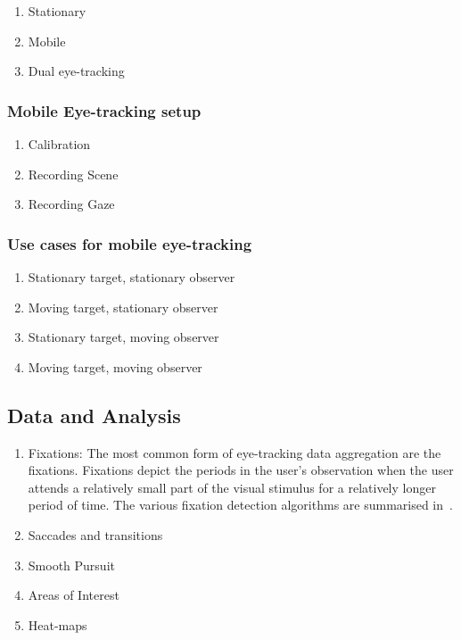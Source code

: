 \documentclass{sig-alternate}
\begin{document}

\begin{enumerate}
\item Stationary
\item Mobile 
\item Dual eye-tracking

\end {enumerate}


\subsubsection{Mobile Eye-tracking setup}

\begin{enumerate}
\item Calibration
\item Recording Scene 
\item Recording Gaze

\end {enumerate}

\subsubsection{Use cases for mobile eye-tracking} 

\begin{enumerate}
\item Stationary target, stationary observer
\item Moving target, stationary observer
\item Stationary target, moving observer
\item Moving target, moving observer
\end{enumerate}


\subsection{Data and Analysis}

\begin{enumerate}
\item Fixations: The most common form of eye-tracking data aggregation are the fixations.
Fixations depict the periods in the user's observation when the user
attends a relatively small part of the visual stimulus for a relatively
longer period of time. The various fixation detection algorithms are
summarised in~\cite{duchowski2007eye}. 

\item Saccades and transitions
\item Smooth Pursuit
\item Areas of Interest
\item Heat-maps

\end {enumerate}
\end{document}
